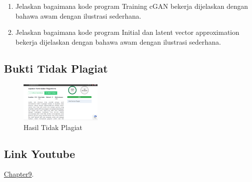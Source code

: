 \begin{enumerate}
\item Jelaskan bagaimana kode program Training cGAN bekerja dijelaskan dengan bahawa awam dengan ilustrasi sederhana.

	\hfill\break
	 
	
\item Jelaskan bagaimana kode program Initial dan latent vector approximation bekerja dijelaskan dengan bahawa awam dengan ilustrasi sederhana.

	\hfill\break
	 

\end{enumerate}

\subsection{Bukti Tidak Plagiat}
\begin{figure}
	\includegraphics[width=4cm]{figures/1174062/9/buktiplagiat.png}
	\centering
	\caption{Hasil Tidak Plagiat}
\end{figure}

\subsection{Link Youtube}
\href{https://www.youtube.com/watch?v=GV18e_jp6DE}{Chapter9}. 